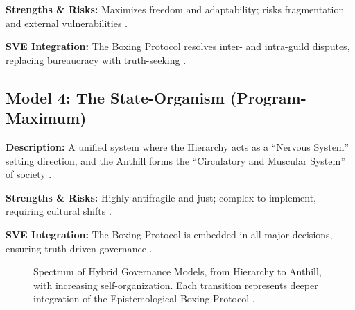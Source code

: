 \documentclass[11pt,a4paper]{article}
\begin{document}
\textbf{Strengths \& Risks:} Maximizes freedom and adaptability; risks fragmentation and external vulnerabilities \citep[lines 2294--2295]{HybridModelsMemo}.

\textbf{SVE Integration:} The Boxing Protocol resolves inter- and intra-guild disputes, replacing bureaucracy with truth-seeking \citep[lines 2297]{HybridModelsMemo}.

\subsection{Model 4: The State-Organism (Program-Maximum)}
\textbf{Description:} A unified system where the Hierarchy acts as a ``Nervous System'' setting direction, and the Anthill forms the ``Circulatory and Muscular System'' of society \citep[lines 2299--2303]{HybridModelsMemo}.

\textbf{Strengths \& Risks:} Highly antifragile and just; complex to implement, requiring cultural shifts \citep[lines 2304--2308]{HybridModelsMemo}.

\textbf{SVE Integration:} The Boxing Protocol is embedded in all major decisions, ensuring truth-driven governance \citep[lines 2310]{HybridModelsMemo}.

\begin{figure}[h!]
\centering
{}
\caption{Spectrum of Hybrid Governance Models, from Hierarchy to Anthill, with increasing self-organization. Each transition represents deeper integration of the Epistemological Boxing Protocol \citep{Kovnatsky2025Boxing}.}
\label{fig:hybrid_spectrum}
\end{figure}
\end{document}
